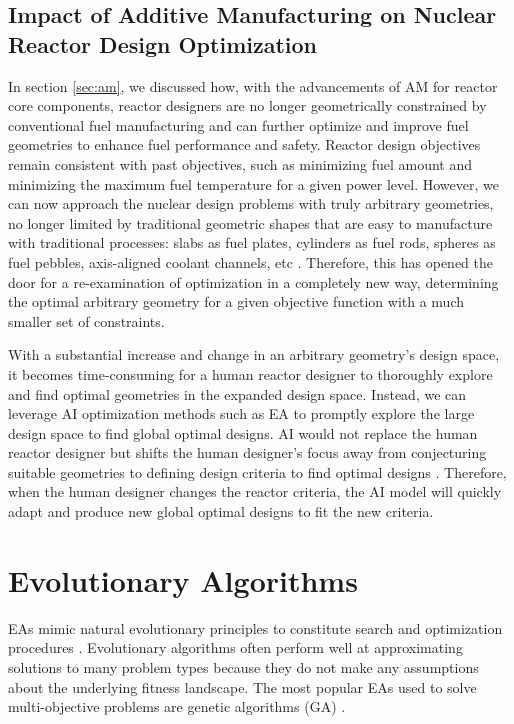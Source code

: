 \subsection{Impact of Additive Manufacturing on Nuclear Reactor Design 
Optimization}
In section \ref{sec:am}, we discussed how, with the advancements of \gls{AM} 
for reactor core components, reactor designers are no longer geometrically 
constrained by conventional fuel manufacturing and can further optimize and 
improve fuel geometries to enhance fuel performance and safety. 
Reactor design objectives remain consistent with past objectives, such as 
minimizing fuel amount and minimizing the maximum fuel temperature for a given 
power level.
However, we can now approach the nuclear design problems with truly arbitrary 
geometries, no longer limited by traditional geometric shapes that are 
easy to manufacture with traditional processes: slabs as fuel plates, cylinders 
as fuel rods, spheres as fuel pebbles, axis-aligned coolant channels, etc  
\cite{sobes_artificial_2020}.
Therefore, this has opened the door for a re-examination of optimization in a 
completely new way, determining the optimal arbitrary geometry for a given objective 
function \cite{sobes_artificial_2020} with a much smaller set of constraints. 

With a substantial increase and change in an arbitrary geometry's design space, 
it becomes time-consuming for a human reactor designer to thoroughly explore 
and find optimal geometries in the expanded design space. 
Instead, we can leverage \gls{AI} optimization methods such as \gls{EA} to 
promptly explore the large design space to find global optimal designs. 
\gls{AI} would not replace the human reactor designer but shifts the human 
designer's focus away from conjecturing suitable geometries to defining design 
criteria to find optimal designs \cite{sobes_artificial_2020}. 
Therefore, when the human designer changes the reactor criteria, the \gls{AI} 
model will quickly adapt and produce new global optimal designs to fit the new 
criteria.  

\section{Evolutionary Algorithms} 
\glspl{EA} mimic natural evolutionary principles to constitute search and 
optimization procedures \cite{deb_multi-objective_2001}. 
Evolutionary algorithms often perform well at approximating solutions to many 
problem types because they do not make any assumptions about the 
underlying fitness landscape.
The most popular \glspl{EA} used to solve multi-objective problems are genetic 
algorithms (GA) \cite{byrne_evolving_2014, krish_practical_2011}. 

